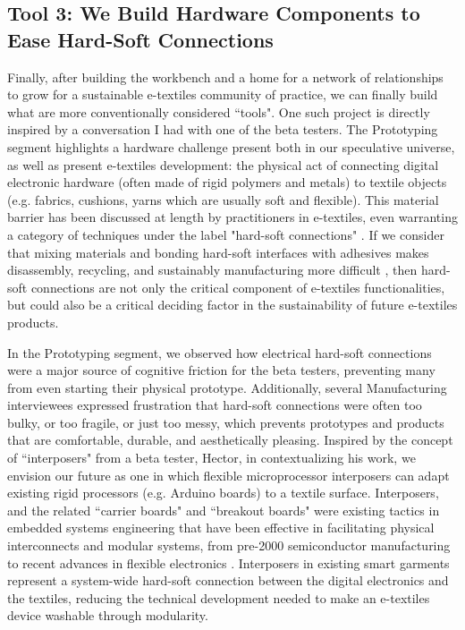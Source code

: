 \subsection{Tool 3: We Build Hardware Components to Ease Hard-Soft Connections}
Finally, after building the workbench and a home for a network of relationships to grow for a sustainable e-textiles community of practice, we can finally build what are more conventionally considered ``tools". One such project is directly inspired by a conversation I had with one of the beta testers. The Prototyping segment highlights a hardware challenge present both in our speculative universe, as well as present e-textiles development: the physical act of connecting digital electronic hardware (often made of rigid polymers and metals) to textile objects (e.g. fabrics, cushions, yarns which are usually soft and flexible). This material barrier has been discussed at length by practitioners in e-textiles, even warranting a category of techniques under the label "hard-soft connections" \cite{kobakant_hardsoft_nodate}.
If we consider that mixing materials and bonding hard-soft interfaces with adhesives makes disassembly, recycling, and sustainably manufacturing more difficult \cite{soh_design_2014, battaia_reverse_2015}
, then hard-soft connections are not only the critical component of e-textiles functionalities, but could also be a critical deciding factor in the sustainability of future e-textiles products.

In the Prototyping segment, we observed how electrical hard-soft connections were a major source of cognitive friction for the beta testers, preventing many from even starting their physical prototype. Additionally, several Manufacturing interviewees expressed frustration that hard-soft connections were often too bulky, or too fragile, or just too messy, which prevents prototypes and products that are comfortable, durable, and aesthetically pleasing.
Inspired by the concept of ``interposers" from a beta tester, Hector, in contextualizing his work, we envision our future as one in which flexible microprocessor interposers can adapt existing rigid processors (e.g. Arduino boards) to a textile surface. Interposers, and the related ``carrier boards" and ``breakout boards" were existing tactics in embedded systems engineering that have been effective in facilitating physical interconnects and modular systems, from pre-2000 semiconductor manufacturing \cite{semiconductor_khandros_1992} to recent advances in flexible electronics \cite{souriau_wafer_2019, vervust_integration_2012}. Interposers in existing smart garments represent a system-wide hard-soft connection between the digital electronics and the textiles, reducing the technical development needed to make an e-textiles device washable through modularity. 

